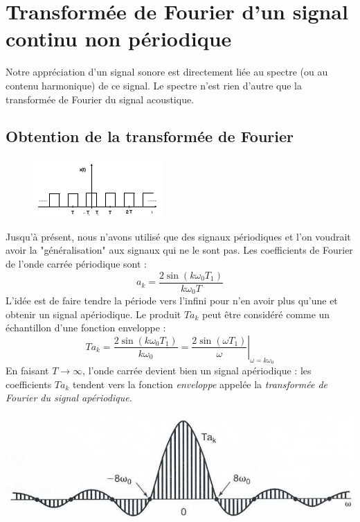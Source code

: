 



\section{Transformée de Fourier d'un signal continu non périodique}
Notre appréciation d’un signal sonore est directement liée au spectre 
(ou au contenu harmonique) de ce signal. Le spectre n'est rien d'autre
que la transformée de Fourier du signal acoustique.

\subsection{Obtention de la transformée de Fourier}
\begin{figure}
	\includegraphics[scale=0.5]{ch10/image1.png}
\end{figure}
Jusqu'à présent, nous n'avons utilisé que des signaux périodiques 
et l'on voudrait avoir la "généralisation" aux signaux qui ne le
sont pas. Les coefficients de Fourier de l'onde carrée périodique
sont :
\begin{equation}
	a_k = \frac{2\sin(k\omega_0T_1)}{k\omega_0T}
\end{equation}
L'idée est de faire tendre la période vers l'infini pour n'en 
avoir plus qu'une et obtenir un signal apériodique. Le produit
$Ta_k$ peut être considéré comme un échantillon d'une fonction 
enveloppe : 
\begin{equation}
	Ta_k = \frac{2\sin(k\omega_0T_1)}{k\omega_0} = \left.\frac{2\sin
		(\omega T_1)}{\omega}\right|_{\omega=k\omega_0}
\end{equation}
En faisant $T\rightarrow\infty$, l'onde carrée devient bien un
signal apériodique : les coefficients $Ta_k$ tendent vers la 
fonction \textit{enveloppe}  appelée la \textit{transformée de
Fourier du signal apériodique.}
\begin{center}
	\includegraphics[scale=0.2]{ch10/image2.png}
\end{center}

